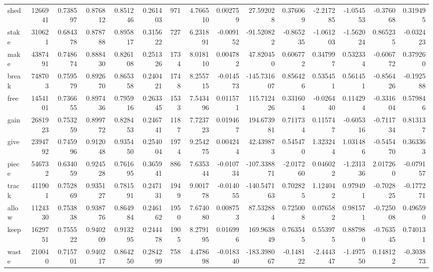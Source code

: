 \begin{tabular}{lrrrrrrrrrrrrrr}
shed      &   1266941 &  0.738597 &      0.876812 &    0.851246 &  0.261403 &   971 &  4.766510 &  0.002759 &   27.592028 &  0.376069 & -2.217285 & -1.054553 &     -0.376068 &         0.319495 \\
stake     &    310621 &  0.684378 &      0.878788 &    0.895817 &  0.315622 &   727 &  6.231891 & -0.009152 &  -91.520822 & -0.865235 & -1.061203 & -1.562024 &      0.865235 &        -0.032423 \\
make      &   4387491 &  0.748674 &      0.888430 &    0.826108 &  0.251326 &  1734 &  8.018110 &  0.004782 &   47.820450 &  0.606772 &  0.347997 &  0.532334 &     -0.606772 &         0.379260 \\
break     &    748703 &  0.759579 &      0.892670 &    0.865358 &  0.240421 &  1748 &  8.255715 & -0.014573 & -145.731607 &  0.856426 &  0.535451 &  0.561451 &     -0.856426 &        -0.192588 \\
free      &   1454101 &  0.736655 &      0.897436 &    0.795916 &  0.263345 &  1533 &  7.543496 &  0.011571 &  115.712426 &  0.331604 & -0.026440 &  0.114294 &     -0.331604 &         0.579846 \\
gain      &   2681923 &  0.753259 &      0.899772 &    0.828453 &  0.246741 &  1187 &  7.723723 &  0.019467 &  194.673981 &  0.711734 &  0.115747 & -0.605316 &     -0.711734 &         0.813137 \\
give      &   2394792 &  0.745996 &      0.912048 &    0.935450 &  0.254004 &  1974 &  9.254275 &  0.004244 &   42.439873 &  0.545470 &  1.323244 &  1.031486 &     -0.545470 &         0.363363 \\
piece     &    546732 &  0.634059 &      0.924528 &    0.761695 &  0.365941 &   886 &  7.635344 & -0.010734 & -107.338871 & -2.017260 &  0.046022 & -1.231336 &      2.017260 &        -0.079157 \\
track     &    411901 &  0.752869 &      0.935127 &    0.781591 &  0.247131 &  1949 &  9.001778 & -0.014055 & -140.547163 &  0.702825 &  1.124042 &  0.979491 &     -0.702825 &        -0.177271 \\
allow     &   1124330 &  0.753838 &      0.938776 &    0.864984 &  0.246162 &  1950 &  7.674080 &  0.008753 &   87.532884 &  0.725008 &  0.076582 &  0.981571 &     -0.725008 &         0.496590 \\
keep      &   1629751 &  0.755522 &      0.940209 &    0.913295 &  0.244478 &  1905 &  8.279195 &  0.016996 &  169.963849 &  0.763545 &  0.553975 &  0.887980 &     -0.763545 &         0.740131 \\
waste     &    210040 &  0.715701 &      0.940217 &    0.864250 &  0.284299 &   758 &  4.478698 & -0.018340 & -183.398067 & -0.148122 & -2.444347 & -1.497550 &      0.148122 &        -0.303873 \\

\end{tabular}
